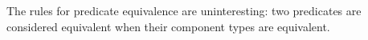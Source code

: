 \documentclass[authoryear, acmsmall, screen, review, nonacm]{acmart}
\begin{document}
\begin{code}%
\>[0]\<%
\\
\>[0][@{}l@{\AgdaIndent{0}}]%
\>[4]\<%
\\
\>[4][@{}l@{\AgdaIndent{0}}]%
\>[8]\AgdaSpace{}%
\AgdaSpace{}%
\AgdaSpace{}%
\AgdaSpace{}%
\AgdaSymbol{:}\AgdaSpace{}%
\AgdaSpace{}%
\AgdaSpace{}%
\<%
\\
%
\>[8]\AgdaSpace{}%
\AgdaSpace{}%
%
\>[19]\AgdaSymbol{:}\AgdaSpace{}%
\AgdaSpace{}%
\AgdaSpace{}%
\AgdaOperator{\AgdaInductiveConstructor{R[}}\AgdaSpace{}%
\AgdaSpace{}%
\AgdaOperator{\AgdaInductiveConstructor{]}}\<%
\\
%
\>[8]\AgdaSpace{}%
%
\>[17]\AgdaSymbol{:}\AgdaSpace{}%
\AgdaSpace{}%
\AgdaSpace{}%
\AgdaOperator{\AgdaInductiveConstructor{R[}}\AgdaSpace{}%
\AgdaSpace{}%
\AgdaOperator{\AgdaInductiveConstructor{]}}\<%
\\
%
\>[8]\AgdaSpace{}%
\AgdaSpace{}%
\AgdaSpace{}%
\AgdaSpace{}%
\AgdaSpace{}%
\AgdaSpace{}%
\AgdaSpace{}%
\AgdaSpace{}%
\AgdaSymbol{:}\AgdaSpace{}%
\AgdaSpace{}%
\AgdaSpace{}%
\<%
\end{code}

The rules for predicate equivalence are uninteresting: two predicates are considered equivalent when their component types are equivalent.
\end{document}
